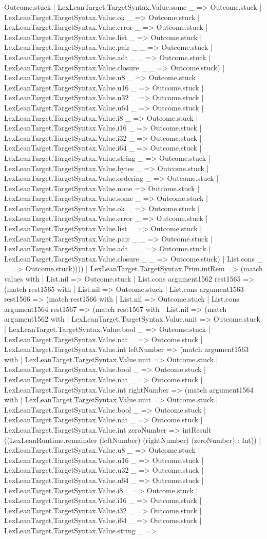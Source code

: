 \documentclass[11pt]{article}
\begin{document}
Outcome.stuck | LexLeanTarget.TargetSyntax.Value.some \_ => Outcome.stuck | LexLeanTarget.TargetSyntax.Value.ok \_ => Outcome.stuck | LexLeanTarget.TargetSyntax.Value.error \_ => Outcome.stuck | LexLeanTarget.TargetSyntax.Value.list \_ => Outcome.stuck | LexLeanTarget.TargetSyntax.Value.pair \_ \_ => Outcome.stuck | LexLeanTarget.TargetSyntax.Value.adt \_ \_ => Outcome.stuck | LexLeanTarget.TargetSyntax.Value.closure \_ \_ => Outcome.stuck) | LexLeanTarget.TargetSyntax.Value.u8 \_ => Outcome.stuck | LexLeanTarget.TargetSyntax.Value.u16 \_ => Outcome.stuck | LexLeanTarget.TargetSyntax.Value.u32 \_ => Outcome.stuck | LexLeanTarget.TargetSyntax.Value.u64 \_ => Outcome.stuck | LexLeanTarget.TargetSyntax.Value.i8 \_ => Outcome.stuck | LexLeanTarget.TargetSyntax.Value.i16 \_ => Outcome.stuck | LexLeanTarget.TargetSyntax.Value.i32 \_ => Outcome.stuck | LexLeanTarget.TargetSyntax.Value.i64 \_ => Outcome.stuck | LexLeanTarget.TargetSyntax.Value.string \_ => Outcome.stuck | LexLeanTarget.TargetSyntax.Value.bytes \_ => Outcome.stuck | LexLeanTarget.TargetSyntax.Value.ordering \_ => Outcome.stuck | LexLeanTarget.TargetSyntax.Value.none => Outcome.stuck | LexLeanTarget.TargetSyntax.Value.some \_ => Outcome.stuck | LexLeanTarget.TargetSyntax.Value.ok \_ => Outcome.stuck | LexLeanTarget.TargetSyntax.Value.error \_ => Outcome.stuck | LexLeanTarget.TargetSyntax.Value.list \_ => Outcome.stuck | LexLeanTarget.TargetSyntax.Value.pair \_ \_ => Outcome.stuck | LexLeanTarget.TargetSyntax.Value.adt \_ \_ => Outcome.stuck | LexLeanTarget.TargetSyntax.Value.closure \_ \_ => Outcome.stuck) | List.cons \_ \_ => Outcome.stuck)))) | LexLeanTarget.TargetSyntax.Prim.intRem => (match values with | List.nil => Outcome.stuck | List.cons argument1562 rest1565 => (match rest1565 with | List.nil => Outcome.stuck | List.cons argument1563 rest1566 => (match rest1566 with | List.nil => Outcome.stuck | List.cons argument1564 rest1567 => (match rest1567 with | List.nil => (match argument1562 with | LexLeanTarget.TargetSyntax.Value.unit => Outcome.stuck | LexLeanTarget.TargetSyntax.Value.bool \_ => Outcome.stuck | LexLeanTarget.TargetSyntax.Value.nat \_ => Outcome.stuck | LexLeanTarget.TargetSyntax.Value.int leftNumber => (match argument1563 with | LexLeanTarget.TargetSyntax.Value.unit => Outcome.stuck | LexLeanTarget.TargetSyntax.Value.bool \_ => Outcome.stuck | LexLeanTarget.TargetSyntax.Value.nat \_ => Outcome.stuck | LexLeanTarget.TargetSyntax.Value.int rightNumber => (match argument1564 with | LexLeanTarget.TargetSyntax.Value.unit => Outcome.stuck | LexLeanTarget.TargetSyntax.Value.bool \_ => Outcome.stuck | LexLeanTarget.TargetSyntax.Value.nat \_ => Outcome.stuck | LexLeanTarget.TargetSyntax.Value.int zeroNumber => intResult ((LexLeanRuntime.remainder (leftNumber) (rightNumber) (zeroNumber) : Int)) | LexLeanTarget.TargetSyntax.Value.u8 \_ => Outcome.stuck | LexLeanTarget.TargetSyntax.Value.u16 \_ => Outcome.stuck | LexLeanTarget.TargetSyntax.Value.u32 \_ => Outcome.stuck | LexLeanTarget.TargetSyntax.Value.u64 \_ => Outcome.stuck | LexLeanTarget.TargetSyntax.Value.i8 \_ => Outcome.stuck | LexLeanTarget.TargetSyntax.Value.i16 \_ => Outcome.stuck | LexLeanTarget.TargetSyntax.Value.i32 \_ => Outcome.stuck | LexLeanTarget.TargetSyntax.Value.i64 \_ => Outcome.stuck | LexLeanTarget.TargetSyntax.Value.string \_ => 
\end{document}
